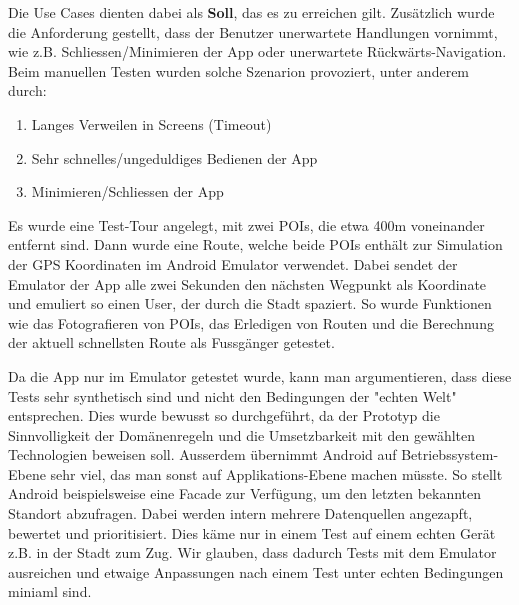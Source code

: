 Die Use Cases dienten dabei als \textbf{Soll}, das es zu erreichen gilt. Zusätzlich wurde die Anforderung
gestellt, dass der Benutzer unerwartete Handlungen vornimmt, wie z.B. Schliessen/Minimieren der App oder
unerwartete Rückwärts-Navigation. Beim manuellen Testen wurden solche Szenarion provoziert, unter anderem
durch:

\begin{enumerate}
    \item Langes Verweilen in Screens (Timeout)
    \item Sehr schnelles/ungeduldiges Bedienen der App 
    \item Minimieren/Schliessen der App
\end{enumerate}

Es wurde eine Test-Tour angelegt, mit zwei POIs, die etwa 400m voneinander entfernt sind. Dann wurde
eine Route, welche beide POIs enthält zur Simulation der GPS Koordinaten im Android Emulator verwendet.
Dabei sendet der Emulator der App alle zwei Sekunden den nächsten Wegpunkt als Koordinate und emuliert
so einen User, der durch die Stadt spaziert. So wurde Funktionen wie das Fotografieren von POIs, das
Erledigen von Routen und die Berechnung der aktuell schnellsten Route als Fussgänger getestet.

Da die App nur im Emulator getestet wurde, kann man argumentieren, dass diese Tests sehr synthetisch
sind und nicht den Bedingungen der "echten Welt" entsprechen. Dies wurde bewusst so durchgeführt, da
der Prototyp die Sinnvolligkeit der Domänenregeln und die Umsetzbarkeit mit den gewählten Technologien
beweisen soll.
Ausserdem übernimmt Android auf Betriebssystem-Ebene sehr viel, das man sonst auf Applikations-Ebene
machen müsste. So stellt Android beispielsweise eine Facade zur Verfügung, um den letzten bekannten
Standort abzufragen. Dabei werden intern mehrere Datenquellen angezapft, bewertet und prioritisiert.
Dies käme nur in einem Test auf einem echten Gerät z.B. in der Stadt zum Zug. Wir glauben, dass dadurch
Tests mit dem Emulator ausreichen und etwaige Anpassungen nach einem Test unter echten Bedingungen
miniaml sind.
